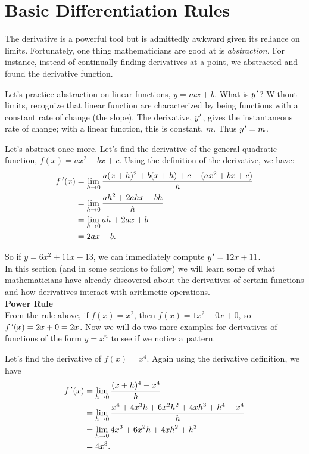 \section{Basic Differentiation Rules}\label{sec:basic_diff_rules}

The derivative is a powerful tool but is admittedly awkward given its reliance on limits. Fortunately, one thing mathematicians are good at is \textit{abstraction.} For instance, instead of continually finding derivatives at a point, we abstracted and found the derivative function. 

Let's practice abstraction on linear functions, $y=mx+b$. What is $y\hskip.75pt'$? Without limits, recognize that linear function are characterized by being functions with a constant rate of change (the slope). The derivative, $y\hskip.75pt'$, gives the instantaneous rate of change; with a linear function, this is constant, $m$. Thus $y\hskip.75pt'=m$. 

Let's abstract once more. Let's find the derivative of the general quadratic function, $f(x) = ax^2+bx+c$. Using the definition of the derivative, we have:
		\begin{align*}
		f\,'(x) 	&=	\lim_{h\to 0}\frac{a(x+h)^2+b(x+h)+c-(ax^2+bx+c)}{h} \\
						&=	\lim_{h\to 0} \frac{ah^2+2ahx+bh}{h} \\
						&=	\lim_{h\to 0} ah+2ax+b\\
						&= 2ax+b.
		\end{align*}
		
So if $y = 6x^2+11x-13$, we can immediately compute $y\hskip.75pt' = 12x+11$. \\

In this section (and in some sections to follow) we will learn some of what mathematicians have already discovered about the derivatives of certain functions and how derivatives interact with arithmetic operations.\\

\noindent\textbf{\large Power Rule}\\

From the rule above, if $f(x)=x^2$, then $f(x)=1x^2+0x+0$, so $f\,'(x) = 2x+0=2x$.  Now we will do two more examples for derivatives of functions of the form $y=x^n$ to see if we notice a pattern.

Let's find the derivative of $f(x) = x^4$.  Again using the derivative definition, we have 
\begin{align*}
		f\,'(x) 	&=	\lim_{h\to 0}\frac{(x+h)^4 - x^4}{h} \\
						&=	\lim_{h\to 0} \frac{x^4+4x^3h + 6x^2h^2 + 4xh^3 + h^4 - x^4}{h} \\
						&=	\lim_{h\to 0} 4x^3 + 6x^2h + 4xh^2 + h^3\\
						&= 4x^3.
		\end{align*}

